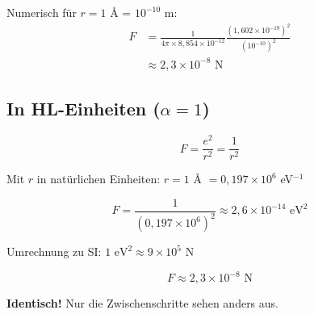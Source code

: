 	Numerisch für $r = 1$ Å = $10^{-10}$ m:
	\begin{align}
		F &= \frac{1}{4\pi \times 8{,}854 \times 10^{-12}} \frac{(1{,}602 \times 10^{-19})^2}{(10^{-10})^2} \\
		&\approx 2{,}3 \times 10^{-8} \text{ N}
	\end{align}
	
	\subsection{In HL-Einheiten ($\alpha = 1$)}
	
	\begin{equation}
		F = \frac{e^2}{r^2} = \frac{1}{r^2}
	\end{equation}
	
	Mit $r$ in natürlichen Einheiten: $r = 1$ Å $= 0{,}197 \times 10^6$ eV$^{-1}$
	
	\begin{equation}
		F = \frac{1}{(0{,}197 \times 10^6)^2} \approx 2{,}6 \times 10^{-14} \text{ eV}^2
	\end{equation}
	
	Umrechnung zu SI: $1 \text{ eV}^2 \approx 9 \times 10^5$ N
	
	\begin{equation}
		F \approx 2{,}3 \times 10^{-8} \text{ N}
	\end{equation}
	
	\textbf{Identisch!} Nur die Zwischenschritte sehen anders aus.
	